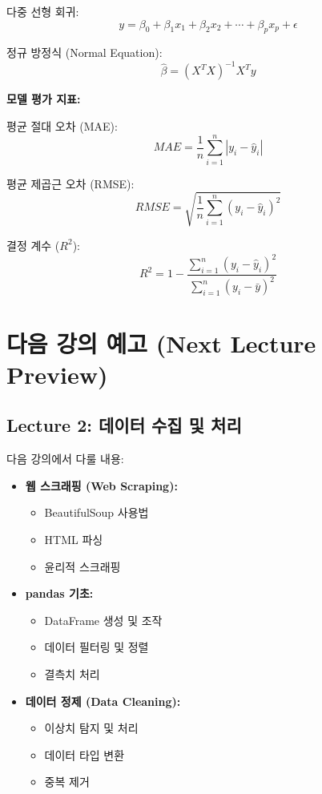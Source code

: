 \documentclass[12pt,a4paper]{article}
\begin{document}
다중 선형 회귀:
\[
y = \beta_0 + \beta_1 x_1 + \beta_2 x_2 + \cdots + \beta_p x_p + \epsilon
\]

정규 방정식 (Normal Equation):
\[
\hat{\beta} = (X^T X)^{-1} X^T y
\]

\textbf{모델 평가 지표:}

평균 절대 오차 (MAE):
\[
MAE = \frac{1}{n}\sum_{i=1}^{n} |y_i - \hat{y}_i|
\]

평균 제곱근 오차 (RMSE):
\[
RMSE = \sqrt{\frac{1}{n}\sum_{i=1}^{n} (y_i - \hat{y}_i)^2}
\]

결정 계수 ($R^2$):
\[
R^2 = 1 - \frac{\sum_{i=1}^{n}(y_i - \hat{y}_i)^2}{\sum_{i=1}^{n}(y_i - \bar{y})^2}
\]

\section{다음 강의 예고 (Next Lecture Preview)}

\subsection{Lecture 2: 데이터 수집 및 처리}

다음 강의에서 다룰 내용:

\begin{itemize}
    \item \textbf{웹 스크래핑 (Web Scraping):}
    \begin{itemize}
        \item BeautifulSoup 사용법
        \item HTML 파싱
        \item 윤리적 스크래핑
    \end{itemize}

    \item \textbf{pandas 기초:}
    \begin{itemize}
        \item DataFrame 생성 및 조작
        \item 데이터 필터링 및 정렬
        \item 결측치 처리
    \end{itemize}

    \item \textbf{데이터 정제 (Data Cleaning):}
    \begin{itemize}
        \item 이상치 탐지 및 처리
        \item 데이터 타입 변환
        \item 중복 제거
    \end{itemize}
\end{itemize}
\end{document}
